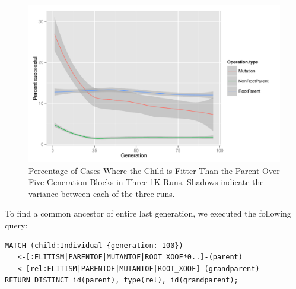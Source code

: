 \documentclass[12pt]{article}
\begin{document}
\begin{figure}[p]
 \centering
 \includegraphics[height=0.63\textwidth]{Percent_successful_Axiom_1K_runs}
 \caption{Percentage of Cases Where the Child is Fitter Than the Parent Over Five Generation Blocks in Three 1K Runs. Shadows indicate the variance between each of the three runs.}
 \label{fig:improvedFitness1K}
\end{figure}


To find a common ancestor of entire last generation, we executed the following query:   

\begin{verbatim}
MATCH (child:Individual {generation: 100})
   <-[:ELITISM|PARENTOF|MUTANTOF|ROOT_XOOF*0..]-(parent)
   <-[rel:ELITISM|PARENTOF|MUTANTOF|ROOT_XOOF]-(grandparent)
RETURN DISTINCT id(parent), type(rel), id(grandparent);
\end{verbatim}
\end{document}
